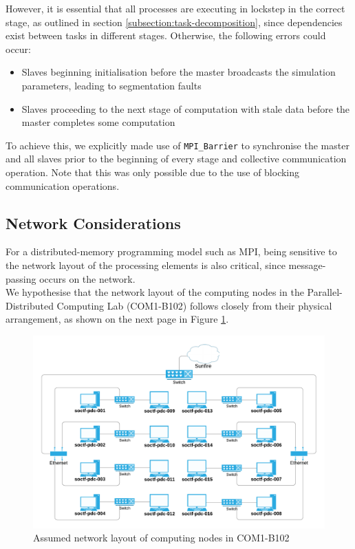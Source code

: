 \documentclass[12pt]{article}
\begin{document}
However, it is essential that all processes are executing in lockstep in the correct stage, as outlined in section \ref{subsection:task-decomposition}, since dependencies exist between tasks in different stages. Otherwise, the following errors could occur:
\begin{itemize}
    \item Slaves beginning initialisation before the master broadcasts the simulation parameters, leading to segmentation faults
    \item Slaves proceeding to the next stage of computation with stale data before the master completes some computation
\end{itemize}

To achieve this, we explicitly made use of \texttt{MPI\_Barrier} to synchronise the master and all slaves prior to the beginning of every stage and collective communication operation. Note that this was only possible due to the use of blocking communication operations.

\subsection{Network Considerations}
For a distributed-memory programming model such as MPI, being sensitive to the network layout of the processing elements is also critical, since message-passing occurs on the network.\\

We hypothesise that the network layout of the computing nodes in the Parallel-Distributed Computing Lab (COM1-B102) follows closely from their physical arrangement, as shown on the next page in Figure \ref{fig:networkLayout}.

\begin{figure}[H]
    \centering
    \includegraphics[width=1.0\textwidth]{reportAssets/chap3nodeNetworkLayout.png}
    \caption{Assumed network layout of computing nodes in COM1-B102}
    \label{fig:networkLayout}
\end{figure}
\end{document}

